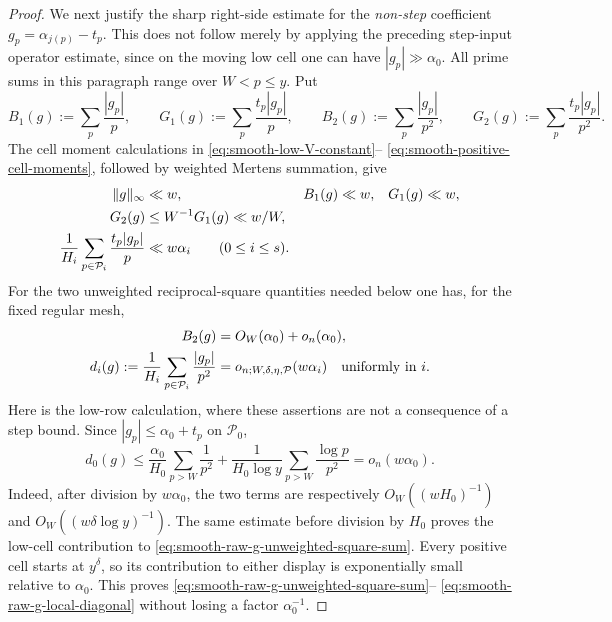 \documentclass[11pt]{article}
\numberwithin{equation}{section}
\theoremstyle{definition}
\theoremstyle{remark}
\newcommand{\1}{\mathbf 1}
\begin{document}
\begin{proof}
We next justify the sharp right-side estimate for the \emph{non-step}
coefficient \(g_p=\alpha_{j(p)}-t_p\).  This does not follow merely by
applying the preceding step-input operator estimate, since on the moving
low cell one can have \(|g_p|\gg\alpha_0\).  All prime sums in this
paragraph range over \(W<p\leq y\).  Put
\begin{equation}
 B_1(g):=\sum_p\frac{|g_p|}{p},\qquad
 G_1(g):=\sum_p\frac{t_p|g_p|}{p},\qquad
 B_2(g):=\sum_p\frac{|g_p|}{p^2},\qquad
 G_2(g):=\sum_p\frac{t_p|g_p|}{p^2}.
 \label{eq:smooth-raw-g-moment-ledger-definition}
\end{equation}
The cell moment calculations in
\eqref{eq:smooth-low-V-constant}--
\eqref{eq:smooth-positive-cell-moments}, followed by weighted Mertens
summation, give
\begin{align}
 \|g\|_\infty&\ll w,&
 B_1(g)&\ll w,&G_1(g)&\ll w,\notag\\
 G_2(g)&\leq W^{-1}G_1(g)\ll w/W,
 \label{eq:smooth-raw-g-first-moment-ledger}\\
 \frac1{H_i}\sum_{p\in\mathcal P_i}
       \frac{t_p|g_p|}{p}&\ll w\alpha_i
       \qquad(0\leq i\leq s).
 \label{eq:smooth-raw-g-local-product-moment}
\end{align}
For the two unweighted reciprocal-square quantities needed below one has,
for the fixed regular mesh,
\begin{align}
 B_2(g)&=O_W(\alpha_0)+o_n(\alpha_0),
 \label{eq:smooth-raw-g-unweighted-square-sum}\\
 d_i(g):=\frac1{H_i}\sum_{p\in\mathcal P_i}\frac{|g_p|}{p^2}
       &=o_{n;W,\delta,\eta,\mathcal P}(w\alpha_i)
       \quad\hbox{uniformly in }i.
 \label{eq:smooth-raw-g-local-diagonal}
\end{align}
Here is the low-row calculation, where these assertions are not a
consequence of a step bound.  Since \(|g_p|\leq\alpha_0+t_p\) on
\(\mathcal P_0\),
\begin{equation}
 d_0(g)\leq
 \frac{\alpha_0}{H_0}\sum_{p>W}\frac1{p^2}
 +\frac1{H_0\log y}\sum_{p>W}\frac{\log p}{p^2}
 =o_n(w\alpha_0).
 \label{eq:smooth-raw-g-low-diagonal-calculation}
\end{equation}
Indeed, after division by \(w\alpha_0\), the two terms are respectively
\(O_W((wH_0)^{-1})\) and
\(O_W((w\delta\log y)^{-1})\).  The same estimate before division by
\(H_0\) proves the low-cell contribution to
\eqref{eq:smooth-raw-g-unweighted-square-sum}.  Every positive cell
starts at \(y^\delta\), so its contribution to either display is
exponentially small relative to \(\alpha_0\).  This proves
\eqref{eq:smooth-raw-g-unweighted-square-sum}--
\eqref{eq:smooth-raw-g-local-diagonal} without losing a factor
\(\alpha_0^{-1}\).


\end{proof}
\end{document}
